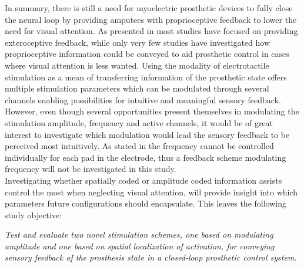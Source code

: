 

In summary, there is still a need for myoelectric prosthetic devices to fully close the neural loop by providing amputees with proprioceptive feedback to lower the need for visual attention. As presented in  most studies have focused on providing exteroceptive feedback, while only very few studies have investigated how proprioceptive information could be conveyed to aid prosthetic control in cases where visual attention is less wanted. Using the modality of electrotactile stimulation as a mean of transferring information of the prosthetic state offers multiple stimulation parameters which can be modulated through several channels enabling possibilities for intuitive and meaningful sensory feedback. However, even though several opportunities present themselves in modulating the stimulation amplitude, frequency and active channels, it would be of great interest to investigate which modulation would lead the sensory feedback to be perceived most intuitively. As stated in  the frequency cannot be controlled individually for each pad in the electrode, thus a feedback scheme modulating frequency will not be investigated in this study. \\ 
Investigating whether spatially coded or amplitude coded information assists control the most when neglecting visual attention, will provide insight into which parameters future configurations should encapsulate. This leaves the following study objective: 

\begin{center}
	\textit{Test and evaluate two novel stimulation schemes, one based on modulating amplitude and one based on spatial localization of activation, for conveying sensory feedback of the prosthesis state in a closed-loop prosthetic control system.}  
\end{center} 